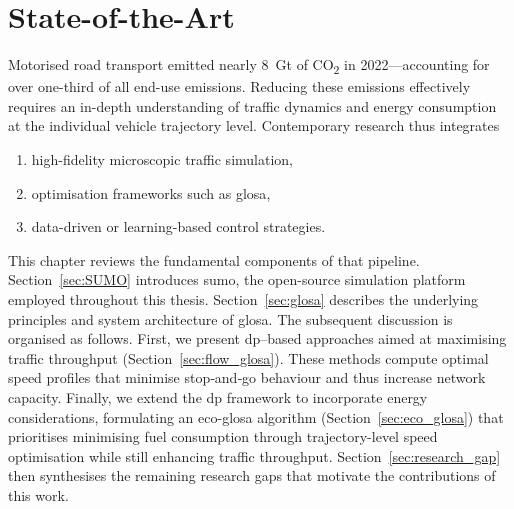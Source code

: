 \chapter{State-of-the-Art}
\label{ch:State_of_the_Art}

Motorised road transport emitted nearly \SI{8}{\giga\tonne} of CO\textsubscript{2} in 2022—accounting for over one-third of all end-use emissions. \cite{IEATransport2024}  
Reducing these emissions effectively requires an in-depth understanding of traffic dynamics and energy consumption at the individual vehicle trajectory level.   
Contemporary research thus integrates  
\begin{enumerate}[label=(\roman*)]
  \item high-fidelity microscopic traffic simulation,
  \item optimisation frameworks such as \ac{glosa},
  \item data-driven or learning-based control strategies.
\end{enumerate}
This chapter reviews the fundamental components of that pipeline. Section~\ref{sec:SUMO} introduces \ac{sumo}, the open-source simulation platform employed throughout this thesis. Section~\ref{sec:glosa} describes the underlying principles and system architecture of \ac{glosa}.
\mynewline
The subsequent discussion is organised as follows. First, we present \ac{dp}–based approaches aimed at maximising traffic throughput (Section~\ref{sec:flow_glosa}). These methods compute optimal speed profiles that minimise stop‐and‐go behaviour and thus increase network capacity. Finally, we extend the \ac{dp} framework to incorporate energy considerations, formulating an \ac{eco-glosa} algorithm (Section~\ref{sec:eco_glosa}) that prioritises minimising fuel consumption through trajectory-level speed optimisation while still enhancing traffic throughput.
\mynewline
Section~\ref{sec:research_gap} then synthesises the remaining research gaps that motivate the contributions of this work.  





